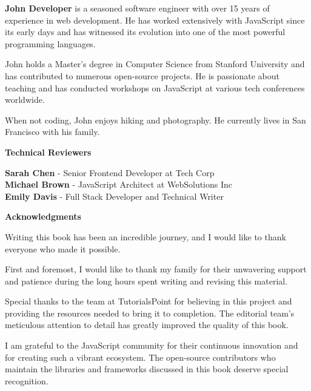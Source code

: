 \documentclass[12pt,a4paper,oneside]{book}
\begin{document}
\vspace{1cm}

\textbf{John Developer} is a seasoned software engineer with over 15 years of experience in web development. He has worked extensively with JavaScript since its early days and has witnessed its evolution into one of the most powerful programming languages.

John holds a Master's degree in Computer Science from Stanford University and has contributed to numerous open-source projects. He is passionate about teaching and has conducted workshops on JavaScript at various tech conferences worldwide.

When not coding, John enjoys hiking and photography. He currently lives in San Francisco with his family.

\vspace{2cm}

\begin{center}
    \large\bfseries Technical Reviewers
\end{center}

\vspace{1cm}

\textbf{Sarah Chen} - Senior Frontend Developer at Tech Corp\\
\textbf{Michael Brown} - JavaScript Architect at WebSolutions Inc\\
\textbf{Emily Davis} - Full Stack Developer and Technical Writer

\clearpage
\thispagestyle{empty}
\vspace*{2cm}
\begin{center}
    \large\bfseries Acknowledgments
\end{center}

\vspace{1cm}

Writing this book has been an incredible journey, and I would like to thank everyone who made it possible.

First and foremost, I would like to thank my family for their unwavering support and patience during the long hours spent writing and revising this material.

Special thanks to the team at TutorialsPoint for believing in this project and providing the resources needed to bring it to completion. The editorial team's meticulous attention to detail has greatly improved the quality of this book.

I am grateful to the JavaScript community for their continuous innovation and for creating such a vibrant ecosystem. The open-source contributors who maintain the libraries and frameworks discussed in this book deserve special recognition.
\end{document}
